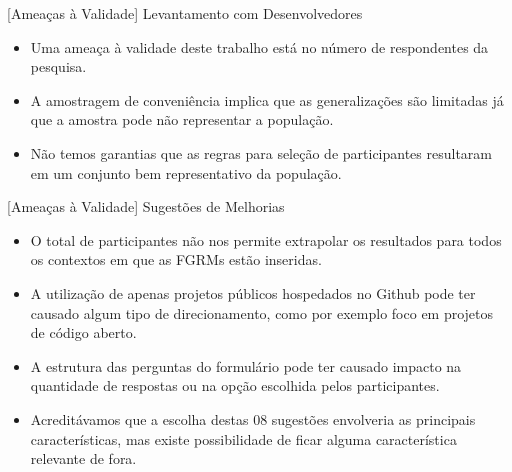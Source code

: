 \documentclass[t,14pt,mathserif]{beamer}
\begin{document}
\begin{frame}{[Ameaças à Validade] Levantamento com Desenvolvedores}

    \begin{itemize}

        \item Uma ameaça à validade deste trabalho está no número de
              respondentes da pesquisa.

        \item A amostragem de conveniência implica que as generalizações são
              limitadas já que a amostra pode não representar a população.

        \item Não temos garantias que as regras para seleção de participantes
              resultaram em um conjunto bem representativo da população.

     \end{itemize}

\end{frame}

\begin{frame}{[Ameaças à Validade] Sugestões de Melhorias}

    \begin{itemize}
        \item O total de participantes não nos permite extrapolar os resultados
            para todos os contextos em que as FGRMs estão inseridas.

        \item A utilização de apenas projetos públicos hospedados no Github pode
            ter causado algum tipo de direcionamento, como por exemplo foco em
            projetos de código aberto.

        \item A estrutura das perguntas do formulário pode ter causado impacto
            na quantidade de respostas ou na opção escolhida pelos
            participantes.

        \item Acreditávamos que a escolha destas 08 sugestões envolveria as
            principais características, mas existe possibilidade de ficar alguma
            característica relevante de fora.
    \end{itemize}

\end{frame}
\end{document}
